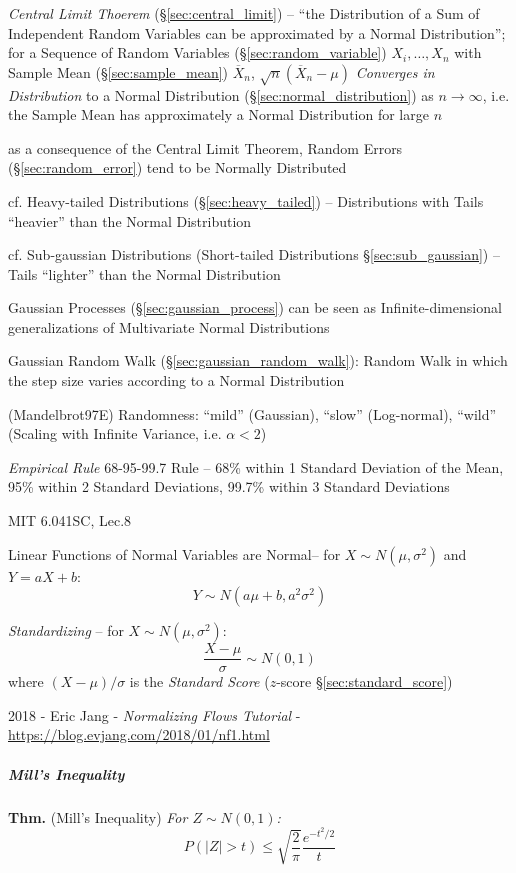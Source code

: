 \emph{Central Limit Thoerem} (\S\ref{sec:central_limit}) -- ``the Distribution
of a Sum of Independent Random Variables can be approximated by a Normal
Distribution'';
for a Sequence of Random Variables (\S\ref{sec:random_variable})
$X_i, \ldots, X_n$ with Sample Mean (\S\ref{sec:sample_mean})
$\overline{X}_n$, $\sqrt{n}(\overline{X}_n - \mu)$
\emph{Converges in Distribution} to a Normal Distribution
(\S\ref{sec:normal_distribution}) as $n \to \infty$, i.e. the Sample
Mean has approximately a Normal Distribution for large $n$

as a consequence of the Central Limit Theorem, Random Errors
(\S\ref{sec:random_error}) tend to be Normally Distributed

cf. Heavy-tailed Distributions (\S\ref{sec:heavy_tailed}) --
Distributions with Tails ``heavier'' than the Normal Distribution

cf. Sub-gaussian Distributions (Short-tailed Distributions
\S\ref{sec:sub_gaussian}) -- Tails ``lighter'' than the Normal Distribution

\fist Gaussian Processes (\S\ref{sec:gaussian_process}) can be seen as
Infinite-dimensional generalizations of Multivariate Normal Distributions

\fist Gaussian Random Walk (\S\ref{sec:gaussian_random_walk}): Random Walk in
which the step size varies according to a Normal Distribution

(Mandelbrot97E) Randomness: ``mild'' (Gaussian), ``slow'' (Log-normal), ``wild''
(Scaling with Infinite Variance, i.e. $\alpha < 2$)

\emph{Empirical Rule} 68-95-99.7 Rule -- 68\% within 1 Standard Deviation of the
Mean, 95\% within 2 Standard Deviations, 99.7\% within 3 Standard Deviations

MIT 6.041SC, Lec.8

Linear Functions of Normal Variables are Normal--
for $X \sim N(\mu, \sigma^2)$ and $Y = aX + b$:
\[
  Y \sim N(a \mu + b, a^2 \sigma^2)
\]

\emph{Standardizing} -- for $X \sim N(\mu, \sigma^2)$:
\[
  \frac{X - \mu}{\sigma} \sim N(0, 1)
\]
where $(X - \mu)/\sigma$ is the \emph{Standard Score}
($z$-score \S\ref{sec:standard_score})

2018 - Eric Jang
- \emph{Normalizing Flows Tutorial}
- \url{https://blog.evjang.com/2018/01/nf1.html}



\subparagraph{Mill's Inequality}\label{sec:mills_inequality}\hfill

\textbf{Thm.} (Mill's Inequality) \emph{
  For $Z \sim N(0,1)$:
  \[
    P(|Z| > t) \leq \sqrt{\frac{2}{\pi}}\frac{e^{-t^2/2}}{t}
  \]
}



